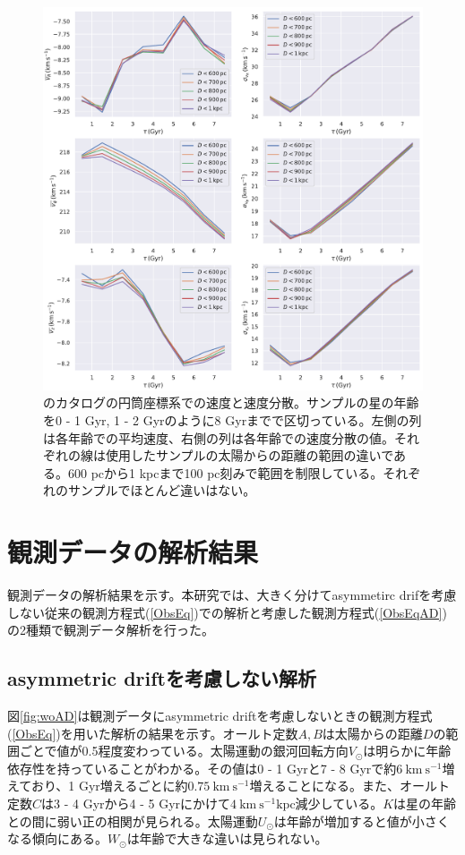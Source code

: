 \begin{figure}[htbp]
	\centering
	\includegraphics[width=15cm]{fig/v_sigma.pdf}
	\caption{\cite{SD18}のカタログの円筒座標系での速度と速度分散。サンプルの星の年齢を0 - 1 Gyr, 1 - 2 Gyrのように8 Gyrまでで区切っている。左側の列は各年齢での平均速度、右側の列は各年齢での速度分散の値。それぞれの線は使用したサンプルの太陽からの距離の範囲の違いである。600 pcから1 kpcまで100 pc刻みで範囲を制限している。それぞれのサンプルでほとんど違いはない。}
	\label{fig:v_sigma}
\end{figure}


\section{観測データの解析結果}
観測データの解析結果を示す。本研究では、大きく分けてasymmetirc drifを考慮しない従来の観測方程式(\ref{ObsEq})での解析と考慮した観測方程式(\ref{ObsEqAD})の2種類で観測データ解析を行った。


\subsection{asymmetric driftを考慮しない解析}
図\ref{fig:woAD}は観測データにasymmetric driftを考慮しないときの観測方程式(\ref{ObsEq})を用いた解析の結果を示す。オールト定数$A,B$は太陽からの距離$D$の範囲ごとで値が0.5程度変わっている。太陽運動の銀河回転方向$V_{\odot}$は明らかに年齢依存性を持っていることがわかる。その値は0 - 1 Gyrと7 - 8 Gyrで約$6\ \mathrm{km\ s^{-1}}$増えており、1 Gyr増えるごとに約$0.75\ \mathrm{km\ s^{-1}}$増えることになる。また、オールト定数$C$は3 - 4 Gyrから4 - 5 Gyrにかけて$4\ \mathrm{km\ s^{-1}kpc}$減少している。$K$は星の年齢との間に弱い正の相関が見られる。太陽運動$U_{\odot}$は年齢が増加すると値が小さくなる傾向にある。$W_{\odot}$は年齢で大きな違いは見られない。

